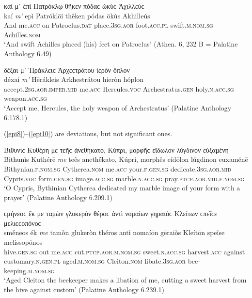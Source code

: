 \begin{exe}
\ex καί μ᾽ ἐπὶ Πατρόκλῳ θῆκεν πόδαϲ ὠκὺϲ Ἀχιλλεύϲ\\
\gll kaí \emph{m'} epì Patróklōi thêken pódas ōkùs Akhilleús\\
And me.\textsc{acc} on Patroclus.\textsc{dat} place.\textsc{3sg.aor} foot.\textsc{acc.pl} swift.\textsc{m.nom.sg} Achilles.\textsc{nom}\\
\trans `And swift Achilles placed (his) feet on Patroclus' (Athen. 6, 232 B = Palatine Anthology 6.49)
\label{epi6}
\end{exe}

\begin{exe}
\ex δέξαι μ᾽ Ἡράκλειϲ Ἀρχεϲτράτου ἱερὸν ὅπλον\\
\gll déxai \emph{m'} Hērákleis Arkhestrátou hieròn hóplon\\
accept.\textsc{2sg.aor.imper.mid} me.\textsc{acc} Hercules.\textsc{voc} Archestratus.\textsc{gen} holy.\textsc{n.acc.sg} weapon.\textsc{acc.sg}\\
\trans `Accept me, Hercules, the holy weapon of Archestratus' (Palatine Anthology 6.178.1)
\label{epi7}
\end{exe}

(\ref{epi8})--(\ref{epi10}) are deviations, but not significant ones. 

\begin{exe}
\ex Βιθυνὶϲ Κυθέρη {με} τεῆϲ ἀνεθήκατο, Κύπρι, μορφῆϲ εἴδωλον λύγδινον εὐξαμένη\\
\gll Bithunìs Kuthérē \emph{me} teês anethḗkato, Kúpri, morphês eídōlon lúgdinon euxaménē\\
Bithynian.\textsc{f.nom.sg} Cytherea.\textsc{nom} me.\textsc{acc} your.\textsc{f.gen.sg} dedicate.\textsc{3sg.aor.mid} Cypris.\textsc{voc} form.\textsc{gen.sg} image.\textsc{acc.sg} marble.\textsc{n.acc.sg} pray.\textsc{ptcp.aor.mid.f.nom.sg}\\
\trans `O Cypris, Bythinian Cytherea dedicated my marble image of your form with a prayer' (Palatine Anthology 6.209.1)
\label{epi8}
\end{exe}

\begin{exe}
\ex ϲμήνεοϲ ἔκ {με} ταμὼν γλυκερὸν θέροϲ ἀντὶ νομαίων γηραιὸϲ Κλείτων ϲπεῖϲε μελιϲϲοπόνοϲ\\
\gll smḗneos ék \emph{me} tamṑn glukeròn théros antì nomaíōn gēraiòs Kleítōn speîse melissopónos\\
hive.\textsc{gen.sg} out me.\textsc{acc} cut.\textsc{ptcp.aor.m.nom.sg} sweet.\textsc{n.acc.sg} harvest.\textsc{acc} against customary.\textsc{n.gen.pl} aged.\textsc{m.nom.sg} Cleiton.\textsc{nom} libate.\textsc{3sg.aor} bee-keeping.\textsc{m.nom.sg}\\
\trans `Aged Cleiton the beekeeper makes a libation of me, cutting a sweet harvest from the hive against custom' (Palatine Anthology 6.239.1)
\label{epi9}
\end{exe}


